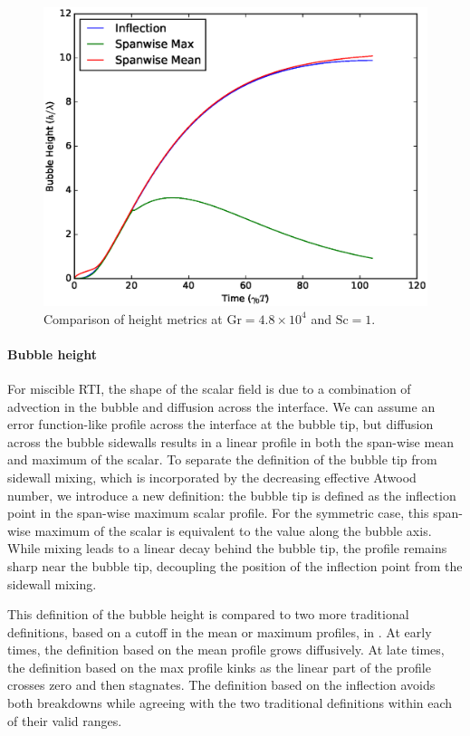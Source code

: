 \begin{figure}
\includegraphics[width=\columnwidth]{figs/comp-height-8-8}
\caption{ 
  Comparison of height metrics at $\text{Gr} = 4.8\times10^4$ and $\text{Sc} = 1$.
}
\end{figure}


\paragraph{Bubble height}
For miscible RTI, the shape of the scalar field is due to a combination of advection in the bubble and diffusion across the interface.
We can assume an error function-like profile across the interface at the bubble tip, but diffusion across the bubble sidewalls results in a linear profile in both the span-wise mean and maximum of the scalar.
To separate the definition of the bubble tip from sidewall mixing, which is incorporated by the decreasing effective Atwood number, we introduce a new definition: the bubble tip is defined as the inflection point in the span-wise maximum scalar profile.
For the symmetric case, this span-wise maximum of the scalar is equivalent to the value along the bubble axis.
While mixing leads to a linear decay behind the bubble tip, the profile remains sharp near the bubble tip, decoupling the position of the inflection point from the sidewall mixing.

This definition of the bubble height is compared to two more traditional definitions, based on a cutoff in the mean or maximum profiles, in .
At early times, the definition based on the mean profile grows diffusively.
At late times, the definition based on the max profile kinks as the linear part of the profile crosses zero and then stagnates.
The definition based on the inflection avoids both breakdowns while agreeing with the two traditional definitions within each of their valid ranges.

